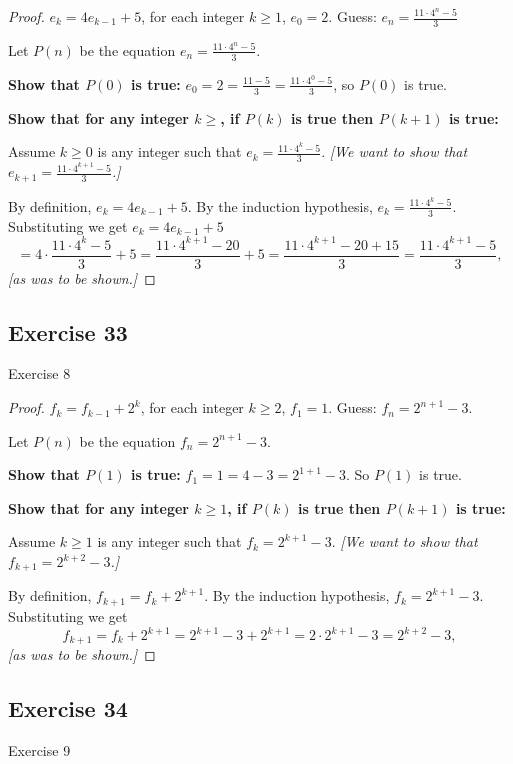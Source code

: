 \documentclass[14pt]{extarticle}
\newcommand{\dps}{\displaystyle}
\begin{document}
\begin{proof}
\(e_k = 4e_{k-1} + 5\), for each integer \(k \geq 1\), \(e_0 = 2\). 
Guess: \(\dps e_n = \frac{11 \cdot 4^n - 5}{3}\)

Let $P(n)$ be the equation \(\dps e_n = \frac{11 \cdot 4^n - 5}{3}\).

{\bf Show that \(P(0)\) is true:} \(e_0 = 2 = \frac{11 - 5}{3} = \frac{11 \cdot 4^0 - 5}{3}\), so $P(0)$ is true.

{\bf Show that for any integer \(k \geq \), if \(P(k)\) is true then \(P(k+1)\) is true:}

Assume \(k \geq 0\) is any integer such that \(\dps e_k = \frac{11 \cdot 4^k - 5}{3}\). 
{\it [We want to show that \(\dps e_{k+1} = \frac{11 \cdot 4^{k+1} - 5}{3}\).]}

By definition, \(e_k = 4e_{k-1} + 5\).
By the induction hypothesis, \(\dps e_k = \frac{11 \cdot 4^k - 5}{3}\).
Substituting we get \(e_k = 4e_{k-1} + 5\)
\[
= 4 \cdot \frac{11 \cdot 4^k - 5}{3} + 5 = \frac{11 \cdot 4^{k+1} - 20}{3} + 5 = 
\frac{11 \cdot 4^{k+1} - 20 + 15}{3} = \frac{11 \cdot 4^{k+1} - 5}{3},
\]
{\it [as was to be shown.]}
\end{proof}

\subsection{Exercise 33}
Exercise 8

\begin{proof}
\(f_k = f_{k-1} + 2^k\), for each integer \(k \geq 2\), \(f_1 = 1\). Guess: \(f_n = 2^{n+1} - 3\).

Let $P(n)$ be the equation \(f_n = 2^{n+1} - 3\).

{\bf Show that \(P(1)\) is true:} \(f_1 = 1 = 4 - 3 = 2^{1+1} - 3\). So $P(1)$ is true.

{\bf Show that for any integer \(k \geq 1\), if \(P(k)\) is true then \(P(k+1)\) is true:}

Assume \(k \geq 1\) is any integer such that \(f_k = 2^{k+1} - 3\). 
{\it [We want to show that \(f_{k+1} = 2^{k+2} - 3\).]}

By definition, \(f_{k+1} = f_k + 2^{k+1}\).
By the induction hypothesis, \(f_k = 2^{k+1} - 3\).
Substituting we get
\[
f_{k+1} = f_k + 2^{k+1} = 2^{k+1} - 3 + 2^{k+1} = 2 \cdot 2^{k+1} - 3 = 2^{k+2} - 3,
\]
{\it [as was to be shown.]}
\end{proof}

\subsection{Exercise 34}
Exercise 9
\end{document}
